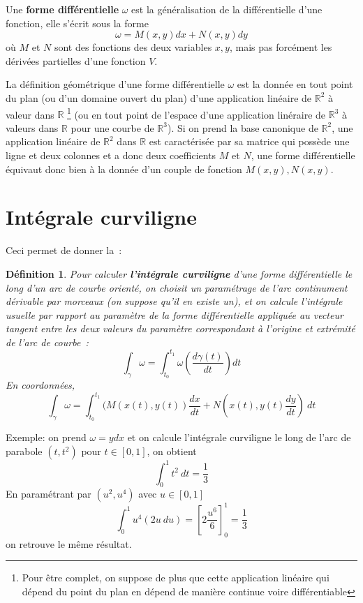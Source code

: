 \documentclass[a4paper,11pt]{book}
\newtheorem{defn}[thm]{D\'efinition}
\begin{document}
\begin{giacjshere}
Une {\bf forme 
diff\'erentielle}
$\omega$ est la g\'en\'eralisation
de la diff\'erentielle d'une fonction, elle s'\'ecrit sous la forme
$$ \omega=M(x,y) dx + N(x,y) dy$$
o\`u $M$ et $N$ sont des fonctions 
des deux variables $x,y$, mais pas forc\'ement les d\'eriv\'ees
partielles d'une fonction $V$.
 
La d\'efinition g\'eom\'etrique d'une forme diff\'erentielle $\omega$
est la donn\'ee en tout point du plan (ou d'un domaine ouvert
du plan) d'une application lin\'eaire de $\mathbb{R}^2$ \`a valeur dans $\mathbb{R}$
\footnote{Pour \^etre complet, on suppose de plus que cette application
lin\'eaire qui d\'epend du point du plan en d\'epend de mani\`ere 
continue voire diff\'erentiable}
(ou en tout point de l'espace d'une application lin\'eraire de $\mathbb{R}^3$
\`a valeurs dans $\mathbb{R}$ pour une courbe de $\mathbb{R}^3$). 
Si on prend la base canonique de $\mathbb{R}^2$,
une application lin\'eaire de $\mathbb{R}^2$ dans $\mathbb{R}$ est caract\'eris\'ee
par sa matrice qui poss\`ede une ligne et deux colonnes et
a donc deux coefficients $M$ et $N$, une forme diff\'erentielle
\'equivaut donc bien \`a la donn\'ee d'un couple de fonction 
$M(x,y),N(x,y)$.

\section{Int\'egrale curviligne}
Ceci permet de donner la~:
\begin{defn}
Pour calculer {\bf l'int\'egrale 
curviligne}
 d'une forme diff\'erentielle 
le long d'un arc de courbe orient\'e,
on choisit un param\'etrage de l'arc continument d\'erivable par morceaux
(on suppose qu'il en existe un), 
et on calcule l'int\'egrale usuelle par rapport au param\`etre
de la forme diff\'erentielle appliqu\'ee au vecteur tangent entre les
deux valeurs du param\`etre correspondant \`a l'origine
et extr\'emit\'e de l'arc de courbe~:
$$ \int_\gamma \omega = \int_{t_0}^{t_1}
\omega\left(\frac{d\gamma(t)}{dt}\right) dt $$
En coordonn\'ees,
$$ \int_\gamma \omega =\int_{t_0}^{t_1} 
(M(x(t),y(t)) \frac{dx}{dt} + N(x(t),y(t) \frac{dy}{dt}) \ dt$$
\end{defn}
Exemple: on prend $\omega=ydx$ et on calcule l'int\'egrale
curviligne le long de l'arc de parabole $(t,t^2)$ pour $t\in[0,1]$,
on obtient
$$ \int_0^1 t^2 \ dt =\frac{1}{3}$$
En param\'etrant par $(u^2,u^4)$ avec $u\in[0,1]$
$$ \int_0^1 u^4 (2u \ du) = \left[2\frac{u^6}{6}\right]_0^1=\frac{1}{3}$$
on retrouve le m\^eme r\'esultat.


\end{giacjshere}
\end{document}
